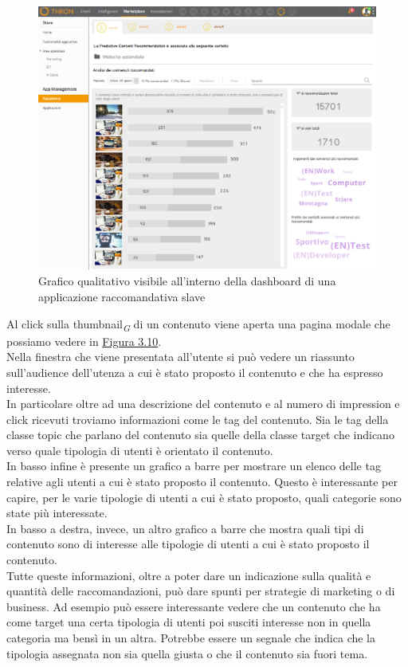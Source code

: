 \documentclass[a4paper, 12pt, twoside, openright]{book}
\newcommand{\gloss}[1]{#1\textsubscript{\textit{\tiny{G}}}}
\begin{document}
\begin{figure}[H]
	\centering
	\label{grafico-qualitativo-1}
	\includegraphics[width=1.0\textwidth]{images/grafico-qualitativo-1.jpg}
	\caption{Grafico qualitativo visibile all'interno della dashboard di una applicazione raccomandativa slave}
\end{figure}
Al click sulla \gloss{thumbnail} di un contenuto viene aperta una pagina modale che possiamo vedere in \hyperref[grafico-qualitativo-2]{Figura 3.10}. \\

Nella finestra che viene presentata all'utente si può vedere un riassunto sull'audience dell'utenza a cui è stato proposto il contenuto e che ha espresso interesse.\\
In particolare oltre ad una descrizione del contenuto e al numero di impression e click ricevuti troviamo informazioni come le tag del contenuto. Sia le tag della classe topic che parlano del contenuto sia quelle della classe target che indicano verso quale tipologia di utenti è orientato il contenuto.\\
In basso infine è presente un grafico a barre per mostrare un elenco delle tag relative agli utenti a cui è stato proposto il contenuto. Questo è interessante per capire, per le varie tipologie di utenti a cui è stato proposto, quali categorie sono state più interessate.\\
In basso a destra, invece, un altro grafico a barre che mostra quali tipi di contenuto sono di interesse alle tipologie di utenti a cui è stato proposto il contenuto.\\
Tutte queste informazioni, oltre a poter dare un indicazione sulla qualità e quantità delle raccomandazioni, può dare spunti per strategie di marketing o di business. Ad esempio può essere interessante vedere che un contenuto che ha come target una certa tipologia di utenti poi susciti interesse non in quella categoria ma bensì in un altra. Potrebbe essere un segnale che indica che la tipologia assegnata non sia quella giusta o che il contenuto sia fuori tema.\\
\end{document}
